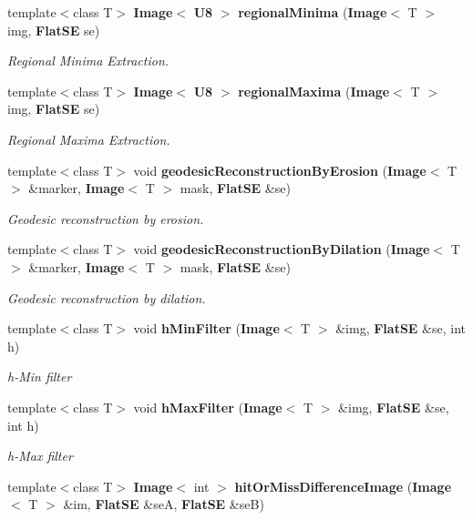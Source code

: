 \begin{CompactItemize}
template$<$class T$>$ {\bf Image}$<$ {\bf U8} $>$ {\bf regional\-Minima} ({\bf Image}$<$ T $>$ img, {\bf Flat\-SE} se)
\begin{CompactList}\small\item\em Regional Minima Extraction. \item\end{CompactList}\item 
template$<$class T$>$ {\bf Image}$<$ {\bf U8} $>$ {\bf regional\-Maxima} ({\bf Image}$<$ T $>$ img, {\bf Flat\-SE} se)
\begin{CompactList}\small\item\em Regional Maxima Extraction. \item\end{CompactList}\item 
template$<$class T$>$ void {\bf geodesic\-Reconstruction\-By\-Erosion} ({\bf Image}$<$ T $>$ \&marker, {\bf Image}$<$ T $>$ mask, {\bf Flat\-SE} \&se)
\begin{CompactList}\small\item\em Geodesic reconstruction by erosion. \item\end{CompactList}\item 
template$<$class T$>$ void {\bf geodesic\-Reconstruction\-By\-Dilation} ({\bf Image}$<$ T $>$ \&marker, {\bf Image}$<$ T $>$ mask, {\bf Flat\-SE} \&se)
\begin{CompactList}\small\item\em Geodesic reconstruction by dilation. \item\end{CompactList}\item 
template$<$class T$>$ void {\bf h\-Min\-Filter} ({\bf Image}$<$ T $>$ \&img, {\bf Flat\-SE} \&se, int h)
\begin{CompactList}\small\item\em h-Min filter \item\end{CompactList}\item 
template$<$class T$>$ void {\bf h\-Max\-Filter} ({\bf Image}$<$ T $>$ \&img, {\bf Flat\-SE} \&se, int h)
\begin{CompactList}\small\item\em h-Max filter \item\end{CompactList}\item 
template$<$class T$>$ {\bf Image}$<$ int $>$ {\bf hit\-Or\-Miss\-Difference\-Image} ({\bf Image}$<$ T $>$ \&im, {\bf Flat\-SE} \&se\-A, {\bf Flat\-SE} \&se\-B)

\end{CompactItemize}
